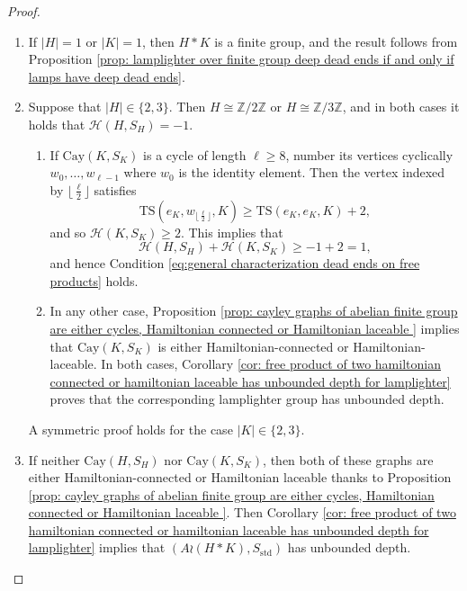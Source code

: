 \documentclass[reqno,oneside]{amsart}
\newcommand{\cay}[2]{\mathrm{Cay}(#1,#2)}
\newcommand{\Z}{\mathbb{Z}}
\newcommand{\std}{S_{\mathrm{std}}}
\newcommand{\TS}[3]{\mathrm{TS}\left(#1,#2,#3\right)}
\theoremstyle{plain}
\theoremstyle{definition}
\begin{document}
\begin{proof}
	\begin{enumerate}
		\item If $|H|=1$ or $|K|=1$, then $H*K$ is a finite group, and the result follows from Proposition \ref{prop: lamplighter over finite group deep dead ends if and only if lamps have deep dead ends}.
		
		\item Suppose that $|H|\in \{2,3\}$. Then $H\cong \Z/2\Z$ or $H\cong\Z/3\Z$, and in both cases it holds that $\mathscr{H}(H,S_H)=-1$.
		\begin{enumerate}
			\item If $\cay{K}{S_K}$ is a cycle of length $\ell\ge 8$, number its vertices cyclically $w_0,\ldots,w_{\ell-1}$ where $w_0$ is the identity element. Then the vertex indexed by $\lfloor \frac{\ell}{2}\rfloor$ satisfies $$\TS{e_K}{w_{\lfloor\frac{\ell}{2}\rfloor} }{K}\ge\TS{e_K}{e_K}{K}+2,$$ and so
			$\mathscr{H}(K,S_K)\ge 2$. This implies that
			$$
			\mathscr{H}(H,S_H)+\mathscr{H}(K,S_K)\ge -1+2=1,
			$$
			and hence Condition \eqref{eq:general characterization dead ends on free products} holds.
			
			\item In any other case, Proposition \ref{prop: cayley graphs of abelian finite group are either cycles, Hamiltonian connected or Hamiltonian laceable } implies that $\cay{K}{S_K}$ is either Hamiltonian-connected or Hamiltonian-laceable. In both cases, Corollary \ref{cor: free product of two hamiltonian connected or hamiltonian laceable has unbounded depth for lamplighter} proves that the corresponding lamplighter group has unbounded depth.
		\end{enumerate}
		A symmetric proof holds for the case $|K|\in \{2,3\}$.
		
		\item If neither $\cay{H}{S_H}$ nor $\cay{K}{S_K}$, then both of these graphs are either Hamiltonian-connected or Hamiltonian laceable thanks to Proposition \ref{prop: cayley graphs of abelian finite group are either cycles, Hamiltonian connected or Hamiltonian laceable }. Then Corollary \ref{cor: free product of two hamiltonian connected or hamiltonian laceable has unbounded depth for lamplighter} implies that $(A\wr(H*K),\std)$ has unbounded depth.


\end{enumerate}
\end{proof}
\end{document}
